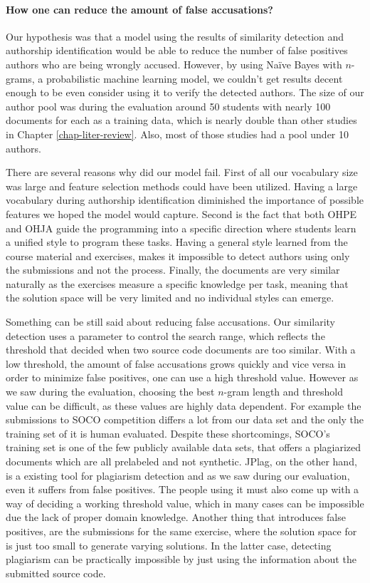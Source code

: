 \paragraph{How one can reduce the amount of false accusations?}
Our hypothesis was that a model using the results of similarity detection and authorship identification would be able to reduce the number of false positives \ie authors who are being wrongly accused. However, by using Naïve Bayes with $n$-grams, a probabilistic machine learning model, we couldn't get results decent enough to be even consider using it to verify the detected authors. The size of our author pool was during the evaluation around 50 students with nearly 100 documents for each as a training data, which is nearly double than other studies in Chapter \ref{chap-liter-review}. Also, most of those studies had a pool under 10 authors. 

There are several reasons why did our model fail. First of all our vocabulary size was large and feature selection methods could have been utilized. Having a large vocabulary during authorship identification diminished the importance of possible features we hoped the model would capture. Second is the fact that both OHPE and OHJA guide the programming into a specific direction where
students learn a unified style to program these tasks. Having a general style learned from the course material and exercises, makes it impossible to detect authors using only the submissions and not the process. Finally, the documents are very similar naturally as the exercises measure a specific knowledge per task, meaning that the solution space will be very limited and no individual styles can emerge.

Something can be still said about reducing false accusations. Our similarity detection uses a parameter to control the search range, which reflects the threshold that decided when two source code documents are too similar. With a low threshold, the amount of false accusations grows quickly and vice versa \ie in order to minimize false positives, one can use a high threshold value. However as we saw during the evaluation, choosing the best $n$-gram length and threshold value can be difficult, as these values are highly data dependent. For example the submissions to SOCO competition differs a lot from our data set and the only the training set of it is human evaluated. Despite these shortcomings, SOCO's training set is one of the few publicly available data sets, that offers a plagiarized documents which are all prelabeled and not synthetic. JPlag, on the other hand, is a existing tool for plagiarism detection and as we saw during our evaluation, even it suffers from false positives. The people using it must also come up with a way of deciding a working threshold value, which in many cases can be impossible due the lack of proper domain knowledge. Another thing that introduces false positives, are the submissions for the same exercise, where the solution space for is just too small to generate varying solutions. In the latter case, detecting plagiarism can be practically impossible by just using the information about the submitted source code.
\mbox{}\\

